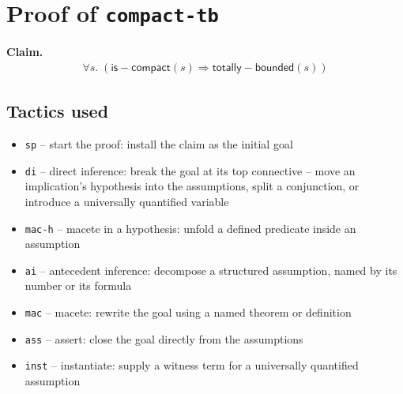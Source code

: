 \documentclass[11pt]{article}
\begin{document}
\section*{Proof of \texttt{compact-tb}}
\textbf{Claim.}
\begin{align*}
  \forall s.\; (\mathsf{is{-}compact}(s) \Rightarrow \mathsf{totally{-}bounded}(s))
\end{align*}
\bigskip

\subsection*{Tactics used}
\begin{itemize}
\item \texttt{sp} -- start the proof: install the claim as the initial goal
\item \texttt{di} -- direct inference: break the goal at its top connective -- move an implication's hypothesis into the assumptions, split a conjunction, or introduce a universally quantified variable
\item \texttt{mac-h} -- macete in a hypothesis: unfold a defined predicate inside an assumption
\item \texttt{ai} -- antecedent inference: decompose a structured assumption, named by its number or its formula
\item \texttt{mac} -- macete: rewrite the goal using a named theorem or definition
\item \texttt{ass} -- assert: close the goal directly from the assumptions
\item \texttt{inst} -- instantiate: supply a witness term for a universally quantified assumption
\end{itemize}
\end{document}
